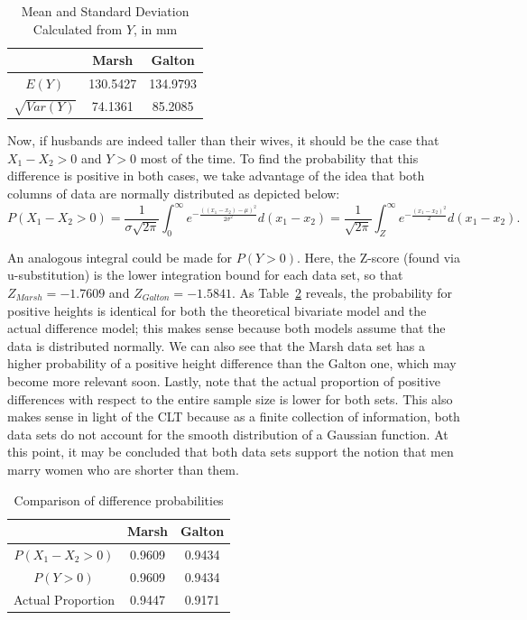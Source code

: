 \begin{table}[h]
    \centering
    \begin{tabular}{c|cc}
         & Marsh & Galton\\
         \midrule
        $E(Y)$ & 130.5427 & 134.9793 \\
        $\sqrt{Var(Y)}$ & 74.1361 & 85.2085 \\
    \end{tabular}
    \caption{Mean and Standard Deviation Calculated from $Y$, in mm}
    \label{tab:statistics-of-differences-sample}
\end{table}

Now, if husbands are indeed taller than their wives, it should be the case that $X_1-X_2>0$ and $Y>0$ most of the time.
To find the probability that this difference is positive in both cases, we take advantage of the idea that both columns of data are normally distributed as depicted below:
\begin{equation}
P(X_1-X_2>0)=\frac{1}{\sigma\sqrt{2\pi}}\int_0 ^\infty e^{-\frac{((x_1-x_2)-\mu)^2}{2\sigma^2}}d(x_1-x_2) =\frac{1}{\sqrt{2\pi}} \int_Z ^
\infty e^{-\frac{(x_1-x_2)^2}{2}} d(x_1-x_2).
\label{eq:probability-of-difference}
\end{equation}

An analogous integral could be made for $P(Y>0)$.
Here, the Z-score (found via u-substitution) is the lower integration bound for each data set, so that $Z_{Marsh}=-1.7609$ and $Z_{Galton}=-1.5841$.
As Table~\ref{tab:comparison-of-difference-probabilities} reveals, the probability for positive heights is identical for both the theoretical bivariate model and the actual difference model; this makes sense because both models assume that the data is distributed normally.
We can also see that the Marsh data set has a higher probability of a positive height difference than the Galton one, which may become more relevant soon.
Lastly, note that the actual proportion of positive differences with respect to the entire sample size is lower for both sets.
This also makes sense in light of the CLT because as a finite collection of information, both data sets do not account for the smooth distribution of a Gaussian function.
At this point, it may be concluded that both data sets support the notion that men marry women who are shorter than them.


\begin{table}[h]
    \centering
    \begin{tabular}{c|cc}
         & Marsh & Galton\\
         \midrule
        $P(X_1-X_2 > 0)$ & 0.9609 & 0.9434 \\
        $P(Y>0)$ & 0.9609 & 0.9434 \\
        Actual Proportion & 0.9447 & 0.9171
    \end{tabular}
    \caption{Comparison of difference probabilities}
    \label{tab:comparison-of-difference-probabilities}
\end{table}

